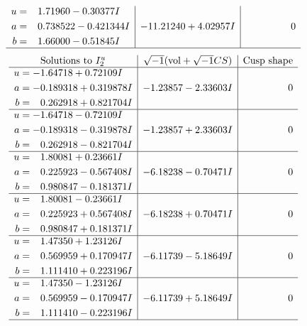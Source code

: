 \documentclass[1p]{elsarticle_modified}
\theoremstyle{definition}
\newcommand{\I}{\sqrt{-1}}
\begin{document}
$$\begin{array}{c|c|c}
\begin{aligned}
u &= \phantom{-}1.71960 - 0.30377 I \\
a &= \phantom{-}0.738522 - 0.421344 I \\
b &= \phantom{-}1.66000 - 0.51845 I\end{aligned}
 & -11.21240 + 4.02957 I & \phantom{-0.000000 } 0\\
 \hline 
 \end{array}$$\newpage$$\begin{array}{c|c|c}  
\text{Solutions to }I^u_{2}& \I (\text{vol} + \sqrt{-1}CS) & \text{Cusp shape}\\
 \hline 
\begin{aligned}
u &= -1.64718 + 0.72109 I \\
a &= -0.189318 + 0.319878 I \\
b &= \phantom{-}0.262918 + 0.821704 I\end{aligned}
 & -1.23857 - 2.33603 I & \phantom{-0.000000 } 0 \\ \hline\begin{aligned}
u &= -1.64718 - 0.72109 I \\
a &= -0.189318 - 0.319878 I \\
b &= \phantom{-}0.262918 - 0.821704 I\end{aligned}
 & -1.23857 + 2.33603 I & \phantom{-0.000000 } 0 \\ \hline\begin{aligned}
u &= \phantom{-}1.80081 + 0.23661 I \\
a &= \phantom{-}0.225923 - 0.567408 I \\
b &= \phantom{-}0.980847 - 0.181371 I\end{aligned}
 & -6.18238 - 0.70471 I & \phantom{-0.000000 } 0 \\ \hline\begin{aligned}
u &= \phantom{-}1.80081 - 0.23661 I \\
a &= \phantom{-}0.225923 + 0.567408 I \\
b &= \phantom{-}0.980847 + 0.181371 I\end{aligned}
 & -6.18238 + 0.70471 I & \phantom{-0.000000 } 0 \\ \hline\begin{aligned}
u &= \phantom{-}1.47350 + 1.23126 I \\
a &= \phantom{-}0.569959 + 0.170947 I \\
b &= \phantom{-}1.111410 + 0.223196 I\end{aligned}
 & -6.11739 - 5.18649 I & \phantom{-0.000000 } 0 \\ \hline\begin{aligned}
u &= \phantom{-}1.47350 - 1.23126 I \\
a &= \phantom{-}0.569959 - 0.170947 I \\
b &= \phantom{-}1.111410 - 0.223196 I\end{aligned}
 & -6.11739 + 5.18649 I & \phantom{-0.000000 } 0\\
 \hline 
 \end{array}$$\newpage
\end{document}

